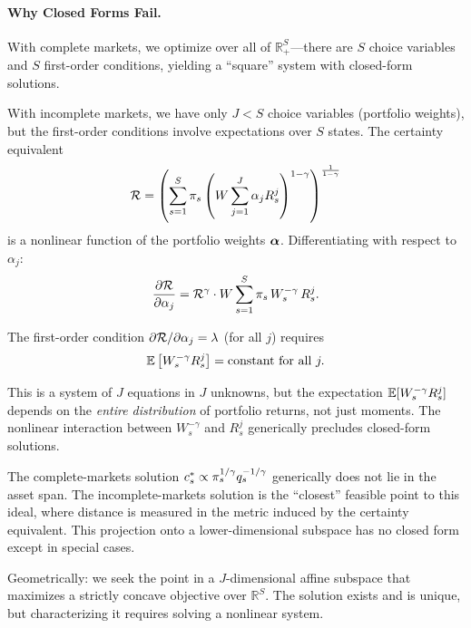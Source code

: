 \paragraph{Why Closed Forms Fail.}

With complete markets, we optimize over all of $\mathbb{R}^S_+$---there are $S$ choice variables and $S$ first-order conditions, yielding a ``square'' system with closed-form solutions.

With incomplete markets, we have only $J < S$ choice variables (portfolio weights), but the first-order conditions involve expectations over $S$ states. The certainty equivalent
\begin{equation}
\mathcal{R} = \left( \sum_{s=1}^{S} \pi_s \left( W \sum_{j=1}^{J} \alpha_j R_s^j \right)^{1-\gamma} \right)^{\frac{1}{1-\gamma}}
\label{eq:ce-incomplete}
\end{equation}
is a nonlinear function of the portfolio weights $\boldsymbol{\alpha}$. Differentiating with respect to $\alpha_j$:
\begin{equation}
\frac{\partial \mathcal{R}}{\partial \alpha_j} = \mathcal{R}^{\gamma} \cdot W \sum_{s=1}^{S} \pi_s \, W_s^{-\gamma} \, R_s^j.
\label{eq:portfolio-foc}
\end{equation}

The first-order condition $\partial \mathcal{R} / \partial \alpha_j = \lambda$ (for all $j$) requires
\begin{equation}
\mathbb{E}\left[ W_s^{-\gamma} R_s^j \right] = \text{constant for all } j.
\label{eq:euler-static}
\end{equation}

This is a system of $J$ equations in $J$ unknowns, but the expectation $\mathbb{E}[W_s^{-\gamma} R_s^j]$ depends on the \emph{entire distribution} of portfolio returns, not just moments. The nonlinear interaction between $W_s^{-\gamma}$ and $R_s^j$ generically precludes closed-form solutions.

\begin{calloutnote}
The complete-markets solution $c_s^{*} \propto \pi_s^{1/\gamma} q_s^{-1/\gamma}$ generically does not lie in the asset span. The incomplete-markets solution is the ``closest'' feasible point to this ideal, where distance is measured in the metric induced by the certainty equivalent. This projection onto a lower-dimensional subspace has no closed form except in special cases.

Geometrically: we seek the point in a $J$-dimensional affine subspace that maximizes a strictly concave objective over $\mathbb{R}^S$. The solution exists and is unique, but characterizing it requires solving a nonlinear system.
\end{calloutnote}

